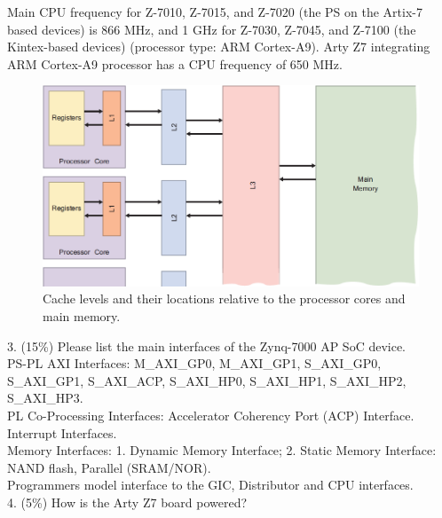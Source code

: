 \documentclass[a4paper]{article}
\begin{document}
Main CPU frequency for Z-7010, Z-7015, and Z-7020 (the PS on the Artix-7 based devices) is 866 MHz, and 1 GHz for Z-7030, Z-7045, and Z-7100 (the Kintex-based devices) (processor type: ARM Cortex-A9). Arty Z7 integrating ARM Cortex-A9 processor has a CPU frequency of 650 MHz.
\begin{figure}[H]
    \centering
    \includegraphics[width=1\textwidth]{1.png}
    \caption{Cache levels and their locations relative to the processor cores and main memory.}
\end{figure}
3. (15\%) Please list the main interfaces of the Zynq-7000 AP SoC device.\\
PS-PL AXI Interfaces: M\_AXI\_GP0, M\_AXI\_GP1, S\_AXI\_GP0, S\_AXI\_GP1, S\_AXI\_ACP, S\_AXI\_HP0, S\_AXI\_HP1, S\_AXI\_HP2, S\_AXI\_HP3.\\
PL Co-Processing Interfaces: Accelerator Coherency Port (ACP) Interface.\\
Interrupt Interfaces.\\
Memory Interfaces: 1. Dynamic Memory Interface; 2. Static Memory Interface: NAND flash, Parallel (SRAM/NOR).\\
Programmers model interface to the GIC, Distributor and CPU interfaces.\\
4. (5\%) How is the Arty Z7 board powered?
\end{document}
